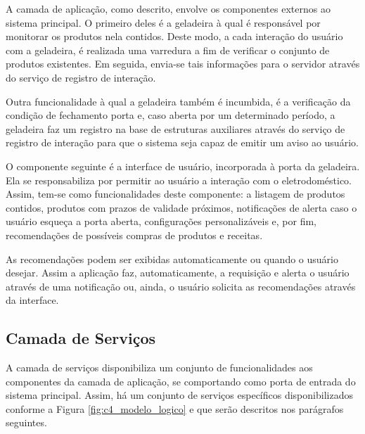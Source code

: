 
A camada de aplicação, como descrito, envolve os componentes  externos ao sistema principal. O primeiro deles é a geladeira à qual é responsável por monitorar os produtos nela contidos. Deste modo, a cada interação do usuário com a geladeira, é realizada uma varredura a fim de verificar o conjunto de produtos existentes. Em seguida, envia-se tais informações para o servidor através do serviço de registro de interação.

Outra funcionalidade à qual a geladeira também é incumbida, é a verificação da condição de fechamento porta e, caso aberta por um determinado período, a geladeira faz um registro na base de estruturas auxiliares através do serviço de registro de interação para que o sistema seja capaz de emitir um aviso ao usuário.


O componente seguinte é a interface de usuário, incorporada à porta da geladeira. Ela se responsabiliza por permitir ao usuário a interação com o eletrodoméstico. Assim, tem-se como funcionalidades deste componente: a listagem de produtos contidos, produtos com prazos de validade próximos, notificações de alerta caso o usuário esqueça a porta aberta, configurações personalizáveis e, por fim, recomendações de possíveis compras de produtos e receitas.

As recomendações podem ser exibidas automaticamente ou quando o usuário desejar. Assim a aplicação faz, automaticamente, a requisição e alerta o usuário através de uma notificação ou, ainda, o usuário solicita as recomendações através da interface.





\subsection{Camada de Serviços}

A camada de serviços disponibiliza um conjunto de funcionalidades aos componentes da camada de aplicação, se comportando como porta de entrada do sistema principal. Assim, há um conjunto de serviços específicos disponibilizados conforme a Figura \ref{fig:c4_modelo_logico} e que serão descritos nos parágrafos seguintes.

